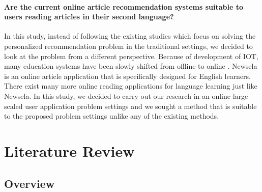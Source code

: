 \subsubsection{Are the current online article recommendation systems suitable to users reading articles in their second language?}
\vspace{10pt}

In this study, instead of following the existing studies which focus on solving the personalized recommendation problem in the traditional settings, we decided to look at the problem from a different perspective. Because of development of IOT, many education systems have been slowly shifted from offline to online \cite{Coursera, Udemy, Teachable}. Newsela \cite{Newsela} is an online article application that is specifically designed for English learners. There exist many more online reading applications for language learning just like Newsela. In this study, we decided to carry out our research in an online large scaled user application problem settings and we sought a method that is suitable to the proposed problem settings unlike any of the existing methods.


\chapter{Literature Review}

\section{Overview}

